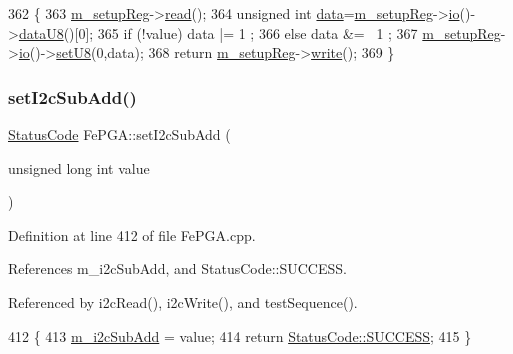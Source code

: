 \begin{DoxyCode}
362                                           \{
363   \hyperlink{classFePGA_a0255fe229013986b4387c3a75ddf4e97}{m\_setupReg}->\hyperlink{classIOobject_aa07610c11963b1db6710e3c76ceea456}{read}();
364   \textcolor{keywordtype}{unsigned} \textcolor{keywordtype}{int} \hyperlink{namespaceshell_a5ea2525995cedc3efd69ea8a7f034d1e}{data}=\hyperlink{classFePGA_a0255fe229013986b4387c3a75ddf4e97}{m\_setupReg}->\hyperlink{classIOobject_af04fb94137c3d86849f478ac5afab5d1}{io}()->\hyperlink{classIOdata_a75e9c318dbac3a39402179070943d4bc}{dataU8}()[0];
365   \textcolor{keywordflow}{if} (!value) data |= 1  ;
366   \textcolor{keywordflow}{else}        data &= ~1 ;
367   \hyperlink{classFePGA_a0255fe229013986b4387c3a75ddf4e97}{m\_setupReg}->\hyperlink{classIOobject_af04fb94137c3d86849f478ac5afab5d1}{io}()->\hyperlink{classIOdata_a6c4fb2f2af01889ada889c2b7aceb24d}{setU8}(0,data);
368   \textcolor{keywordflow}{return} \hyperlink{classFePGA_a0255fe229013986b4387c3a75ddf4e97}{m\_setupReg}->\hyperlink{classIOobject_a9f6984bc9f0fadcf800f1be2523ac744}{write}();
369 \}
\end{DoxyCode}
\mbox{\label{classFePGA_a37c1ee5bf89667c641f321479697166f}} 
\subsubsection{\texorpdfstring{set\+I2c\+Sub\+Add()}{setI2cSubAdd()}}
{\footnotesize\ttfamily \hyperlink{classStatusCode}{Status\+Code} Fe\+P\+G\+A\+::set\+I2c\+Sub\+Add (\begin{DoxyParamCaption}\item[{unsigned long int}]{value }\end{DoxyParamCaption})}



Definition at line 412 of file Fe\+P\+G\+A.\+cpp.



References m\+\_\+i2c\+Sub\+Add, and Status\+Code\+::\+S\+U\+C\+C\+E\+SS.



Referenced by i2c\+Read(), i2c\+Write(), and test\+Sequence().


\begin{DoxyCode}
412                                                        \{
413   \hyperlink{classFePGA_aba8c2c8d8e0d136826b9dd4c2d7c2e90}{m\_i2cSubAdd} = value;
414   \textcolor{keywordflow}{return} \hyperlink{classStatusCode_a6f565cbeadc76d14c72f047e5e85eb4badd0da38d3ba0d922efd1f4619bc37ad8}{StatusCode::SUCCESS};
415 \}
\end{DoxyCode}
\mbox{\label{classFePGA_a2cd235d1971625d6742d4f3107489a07}} 

